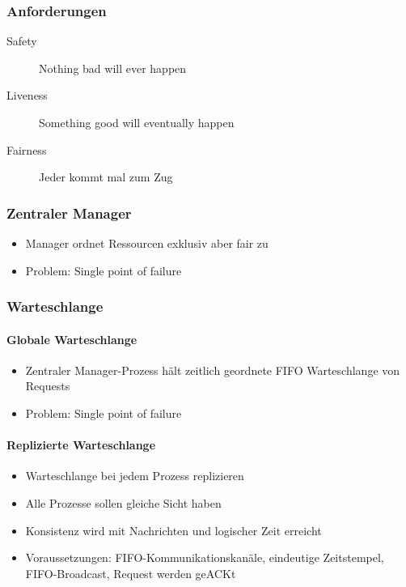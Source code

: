 \documentclass[10pt,a4paper]{article}
\begin{document}
\subsubsection{Anforderungen}
\begin{description}
\item[Safety] Nothing bad will ever happen
\item[Liveness] Something good will eventually happen
\item[Fairness] Jeder kommt mal zum Zug
\end{description}

\subsubsection{Zentraler Manager}
\begin{itemize}
\item Manager ordnet Ressourcen exklusiv aber fair zu
\item Problem: Single point of failure
\end{itemize}

\subsubsection{Warteschlange}
\paragraph{Globale Warteschlange}
\begin{itemize}
\item Zentraler Manager-Prozess hält zeitlich geordnete FIFO Warteschlange von Requests
\item Problem: Single point of failure
\end{itemize}

\paragraph{Replizierte Warteschlange}
\begin{itemize}
\item Warteschlange bei jedem Prozess replizieren
\item Alle Prozesse sollen gleiche Sicht haben
\item Konsistenz wird mit Nachrichten und logischer Zeit erreicht
\item Voraussetzungen: FIFO-Kommunikationskanäle, eindeutige Zeitstempel, FIFO-Broadcast, Request werden geACKt
\end{itemize}
\end{document}
